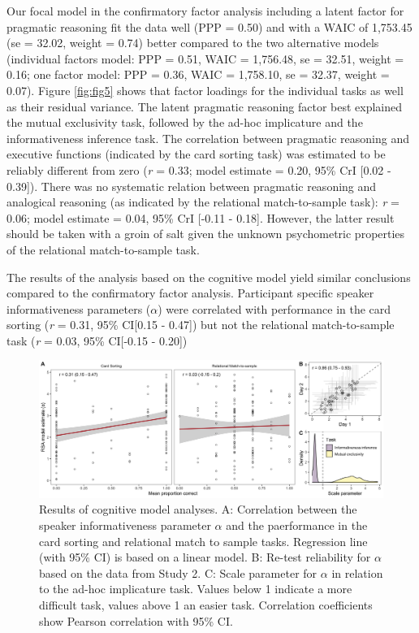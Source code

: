 \documentclass[
  english,
  man,floatsintext]{apa6}
\begin{document}
Our focal model in the confirmatory factor analysis including a latent factor for pragmatic reasoning fit the data well (PPP = 0.50) and with a WAIC of 1,753.45 (se = 32.02, weight = 0.74) better compared to the two alternative models (individual factors model: PPP = 0.51, WAIC = 1,756.48, se = 32.51, weight = 0.16; one factor model: PPP = 0.36, WAIC = 1,758.10, se = 32.37, weight = 0.07). Figure \ref{fig:fig5} shows that factor loadings for the individual tasks as well as their residual variance. The latent pragmatic reasoning factor best explained the mutual exclusivity task, followed by the ad-hoc implicature and the informativeness inference task. The correlation between pragmatic reasoning and executive functions (indicated by the card sorting task) was estimated to be reliably different from zero (\emph{r} = 0.33; model estimate = 0.20, 95\% CrI {[}0.02 - 0.39{]}). There was no systematic relation between pragmatic reasoning and analogical reasoning (as indicated by the relational match-to-sample task): \emph{r} = 0.06; model estimate = 0.04, 95\% CrI {[}-0.11 - 0.18{]}. However, the latter result should be taken with a groin of salt given the unknown psychometric properties of the relational match-to-sample task.

The results of the analysis based on the cognitive model yield similar conclusions compared to the confirmatory factor analysis. Participant specific speaker informativeness parameters (\(\alpha\)) were correlated with performance in the card sorting (\emph{r} = 0.31, 95\% CI{[}0.15 - 0.47{]}) but not the relational match-to-sample task (\emph{r} = 0.03, 95\% CI{[}-0.15 - 0.20{]})



\begin{figure}

{\centering \includegraphics[width=1\linewidth]{./figures/figure6} 

}

\caption{Results of cognitive model analyses. A: Correlation between the speaker informativeness parameter \(\alpha\) and the paerformance in the card sorting and relational match to sample tasks. Regression line (with 95\% CI) is based on a linear model. B: Re-test reliability for \(\alpha\) based on the data from Study 2. C: Scale parameter for \(\alpha\) in relation to the ad-hoc implicature task. Values below 1 indicate a more difficult task, values above 1 an easier task. Correlation coefficients show Pearson correlation with 95\% CI.}\label{fig:fig6}
\end{figure}
\end{document}

